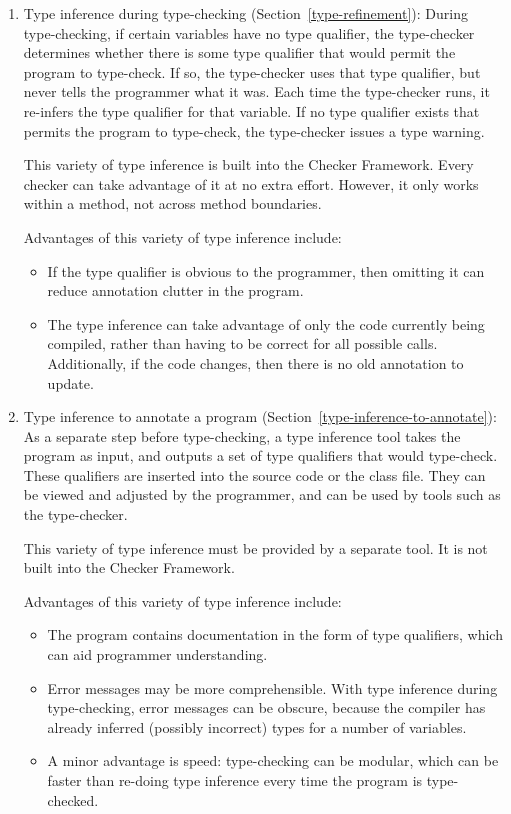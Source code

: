 \begin{enumerate}
\item
  Type inference during type-checking (Section~\ref{type-refinement}):
  During type-checking, if certain variables have no type qualifier, the
  type-checker determines whether there is some type qualifier that would
  permit the program to type-check.  If so, the type-checker uses that type
  qualifier, but never tells the programmer what it was.  Each time the
  type-checker runs, it re-infers the type qualifier for that variable.  If
  no type qualifier exists that permits the program to type-check, the
  type-checker issues a type warning.

  This variety of type inference is built into the Checker Framework.  Every
  checker can take advantage of it at no extra effort.  However, it only
  works within a method, not across method boundaries.

  Advantages of this variety of type inference include:
  \begin{itemize}
  \item
    If the type qualifier is obvious to the programmer, then omitting it
    can reduce annotation clutter in the program.
  \item
    The type inference can take advantage of only the code currently being
    compiled, rather than having to be correct for all possible calls.
    Additionally, if the code changes, then there is no old annotation to
    update.
  \end{itemize}


\item
  Type inference to annotate a program (Section~\ref{type-inference-to-annotate}):
  As a separate step before type-checking, a type inference tool takes the
  program as input, and outputs a set of type qualifiers that would
  type-check.  These qualifiers are inserted into the source code or the
  class file.  They can be viewed and adjusted by the programmer, and can
  be used by tools such as the type-checker.

  This variety of type inference must be provided by a separate tool.  It
  is not built into the Checker Framework.

  Advantages of this variety of type inference include:
  \begin{itemize}
  \item
    The program contains documentation in the form of type qualifiers,
    which can aid programmer understanding.
  \item
    Error messages may be more comprehensible.  With type inference
    during type-checking, error messages can be obscure, because the
    compiler has already inferred (possibly incorrect) types for a number
    of variables.
  \item
    A minor advantage is speed:  type-checking can be modular, which can be
    faster than re-doing type inference every time the
    program is type-checked.
  \end{itemize}

\end{enumerate}

